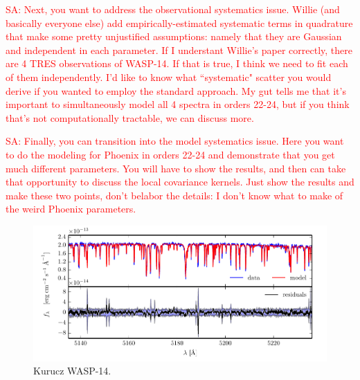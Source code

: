 \documentclass[iop,floatfix]{emulateapj}
\newcommand{\Z}{[{\rm Fe}/{\rm H}]}
\newcommand{\comm}[1]{ \textcolor{red}{SA: #1}}
\begin{document}
\comm{Next, you want to address the observational systematics issue.  Willie (and basically 
everyone else) add empirically-estimated systematic terms in quadrature that make some pretty 
unjustified assumptions: namely that they are Gaussian and independent in each parameter.  If I 
understant Willie's paper correctly, there are 4 TRES observations of WASP-14.  If that is true, I 
think we need to fit each of them independently.  I'd like to know what ``systematic" scatter you 
would derive if you wanted to employ the standard approach.  My gut tells me that it's important to 
simultaneously model all 4 spectra in orders 22-24, but if you think that's not 
computationally tractable, we can discuss more.}

\comm{Finally, you can transition into the model systematics issue.  Here you want to do the 
modeling for Phoenix in orders 22-24 and demonstrate that you get much different parameters.  You 
will have to show the results, and then can take that opportunity to discuss the local covariance 
kernels.  Just show the results and make these two points, don't belabor the details: I don't 
know what to make of the weird Phoenix parameters.}

\begin{figure}[!htb]
\begin{center}
\includegraphics{figs/residuals_PHOENIX_logg.pdf}
\caption{Kurucz WASP-14.}
\label{fig:residuals_PHOENIX}
\end{center}
\end{figure}
\end{document}
